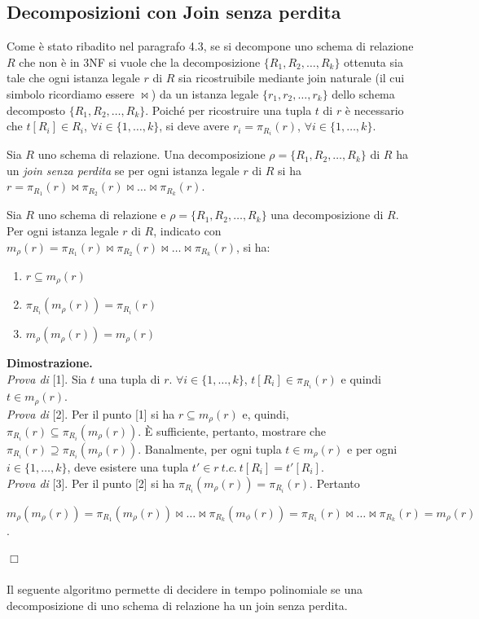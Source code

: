 \subsection{Decomposizioni con Join senza perdita}

Come è stato ribadito nel paragrafo 4.3, se si decompone uno schema di relazione $R$ che non è in 3NF si
vuole che la decomposizione $\{R_1, R_2, \ldots, R_k\}$ ottenuta sia tale che ogni istanza legale $r$
di $R$ sia ricostruibile mediante join naturale (il cui simbolo ricordiamo essere $\bowtie$) da un istanza 
legale $\{r_1, r_2, \ldots, r_k\}$ dello schema decomposto $\{R_1, R_2, \ldots, R_k\}$. Poiché per ricostruire
una tupla $t$ di $r$ è necessario che $t[R_i] \in R_i$, $\forall i \in \{1, \ldots, k\}$, si deve avere $r_i =
\pi_{R_i}(r)$, $\forall i \in \{1, \ldots, k\}$.
\begin{defn}
Sia $R$ uno schema di relazione. Una decomposizione $\rho = \{R_1, R_2, \ldots, R_k\}$ di $R$ ha un
\emph{join senza perdita} se per ogni istanza legale $r$ di $R$ si ha $r = \pi_{R_1}(r) \bowtie \pi_{R_2}(r) 
\bowtie \ldots \bowtie \pi_{R_k}(r)$.
\end{defn}
\begin{theo}
Sia $R$ uno schema di relazione e $\rho = \{R_1, R_2, \ldots, R_k\}$ una decomposizione di $R$. Per ogni
istanza legale $r$ di $R$, indicato con $m_{\rho}(r) =\pi_{R_1}(r) \bowtie \pi_{R_2}(r) 
\bowtie \ldots \bowtie \pi_{R_k}(r)$, si ha:
\begin{enumerate}
 \item $r\subseteq m_{\rho}(r)$
 \item $\pi_{R_i}(m_{\rho}(r)) = \pi_{R_i}(r)$
 \item $m_{\rho}(m_{\rho}(r)) = m_{\rho}(r)$
\end{enumerate}
\end{theo}
\textbf{Dimostrazione.}\\
\emph{Prova di }[1]. Sia $t$ una tupla di $r$. $\forall i \in \{1, \ldots, k\}$, $t[R_i] \in \pi_{R_i}(r)$ e
quindi $t \in m_{\rho}(r)$.\\
\emph{Prova di }[2]. Per il punto [1] si ha $r \subseteq m_{\rho}(r)$ e, quindi, $\pi_{R_i}(r) \subseteq 
\pi_{R_i}(m_{\rho}(r))$. \`E sufficiente, pertanto, mostrare che $\pi_{R_i}(r) \supseteq \pi_{R_i}(m_{\rho}(r))$.
Banalmente, per ogni tupla $t \in m_\rho(r)$ e per ogni $i \in \{1, \ldots, k\}$, deve esistere una tupla
$t' \in r\ t.c.\ t[R_i] = t'[R_i]$.\\
\emph{Prova di }[3]. Per il punto [2] si ha $\pi_{R_i}(m_\rho(r)) = \pi_{R_i}(r)$. Pertanto
\begin{center}
$m_\rho(m_\rho(r)) = \pi_{R_1}(m_\rho(r)) \bowtie \ldots \bowtie \pi_{R_k}(m_\phi(r)) = \pi_{R_1}(r) \bowtie
\ldots \bowtie \pi_{R_k}(r) = m_\rho(r)$. 
\end{center}
\hfill $\Box$\\\\
Il seguente algoritmo permette di decidere in tempo polinomiale se una decomposizione di uno schema di relazione
ha un join senza perdita.

